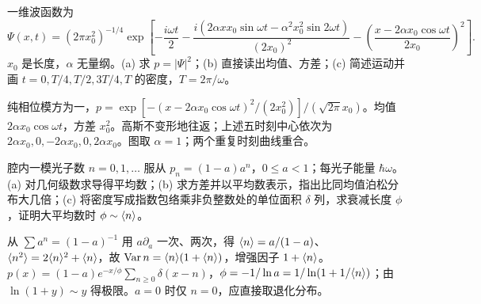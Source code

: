 \begin{exercise}
一维波函数为
\[\Psi(x,t)=(2\pi x_0^2)^{-1/4}\exp\left[-\frac{i\omega t}{2}-\frac{i(2\alpha xx_0\sin\omega t-\alpha^2x_0^2\sin2\omega t)}{(2x_0)^2}-\left(\frac{x-2\alpha x_0\cos\omega t}{2x_0}\right)^2\right].\]
$x_0$ 是长度，$\alpha$ 无量纲。(a) 求 $p=|\Psi|^2$；(b) 直接读出均值、方差；(c) 简述运动并画 $t=0,T/4,T/2,3T/4,T$ 的密度，$T=2\pi/\omega$。
\end{exercise}
\begin{solution}
纯相位模方为一，$p=\exp[-(x-2\alpha x_0\cos\omega t)^2/(2x_0^2)]/(\sqrt{2\pi}x_0)$。均值 $2\alpha x_0\cos\omega t$，方差 $x_0^2$。高斯不变形地往返；上述五时刻中心依次为 $2\alpha x_0,0,-2\alpha x_0,0,2\alpha x_0$。图取 $\alpha=1$；两个重复时刻曲线重合。
\end{solution}
\begin{center}\end{center}
\begin{exercise}
腔内一模光子数 $n=0,1,\ldots$ 服从 $p_n=(1-a)a^n$，$0\le a<1$；每光子能量 $\hbar\omega$。(a) 对几何级数求导得平均数；(b) 求方差并以平均数表示，指出比同均值泊松分布大几倍；(c) 将密度写成指数包络乘非负整数处的单位面积 $\delta$ 列，求衰减长度 $\phi$，证明大平均数时 $\phi\sim\langle n\rangle$。
\end{exercise}
\begin{solution}
从 $\sum a^n=(1-a)^{-1}$ 用 $a\partial_a$ 一次、两次，得 $\langle n\rangle=a/(1-a)$、$\langle n^2\rangle=2\langle n\rangle^2+\langle n\rangle$，故 $\operatorname{Var} n=\langle n\rangle(1+\langle n\rangle)$，增强因子 $1+\langle n\rangle$。$p(x)=(1-a)e^{-x/\phi}\sum_{n\ge0}\delta(x-n)$，$\phi=-1/\ln a=1/\ln(1+1/\langle n\rangle)$；由 $\ln(1+y)\sim y$ 得极限。$a=0$ 时仅 $n=0$，应直接取退化分布。
\end{solution}
